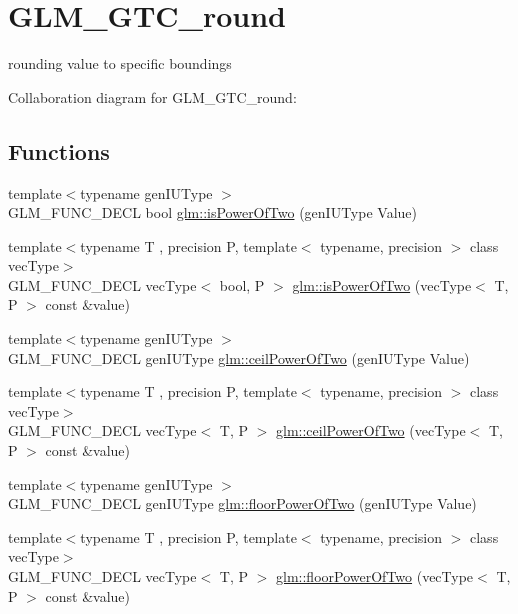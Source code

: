\hypertarget{group__gtc__round}{\section{G\-L\-M\-\_\-\-G\-T\-C\-\_\-round}
\label{group__gtc__round}
}


rounding value to specific boundings  


Collaboration diagram for G\-L\-M\-\_\-\-G\-T\-C\-\_\-round\-:
\subsection*{Functions}
\begin{DoxyCompactItemize}
\item 
{\footnotesize template$<$typename gen\-I\-U\-Type $>$ }\\G\-L\-M\-\_\-\-F\-U\-N\-C\-\_\-\-D\-E\-C\-L bool \hyperlink{group__gtc__round_gaebf826fbb6e0a70eeaab0792d89b25ec}{glm\-::is\-Power\-Of\-Two} (gen\-I\-U\-Type Value)
\item 
{\footnotesize template$<$typename T , precision P, template$<$ typename, precision $>$ class vec\-Type$>$ }\\G\-L\-M\-\_\-\-F\-U\-N\-C\-\_\-\-D\-E\-C\-L vec\-Type$<$ bool, P $>$ \hyperlink{group__gtc__round_gad454e4c8d8cd73ddc7de855f733a1465}{glm\-::is\-Power\-Of\-Two} (vec\-Type$<$ T, P $>$ const \&value)
\item 
{\footnotesize template$<$typename gen\-I\-U\-Type $>$ }\\G\-L\-M\-\_\-\-F\-U\-N\-C\-\_\-\-D\-E\-C\-L gen\-I\-U\-Type \hyperlink{group__gtc__round_gaa73c7690c787086fa3ac1c312264acab}{glm\-::ceil\-Power\-Of\-Two} (gen\-I\-U\-Type Value)
\item 
{\footnotesize template$<$typename T , precision P, template$<$ typename, precision $>$ class vec\-Type$>$ }\\G\-L\-M\-\_\-\-F\-U\-N\-C\-\_\-\-D\-E\-C\-L vec\-Type$<$ T, P $>$ \hyperlink{group__gtc__round_ga76ec9b214ea1376fe09a903e34bab847}{glm\-::ceil\-Power\-Of\-Two} (vec\-Type$<$ T, P $>$ const \&value)
\item 
{\footnotesize template$<$typename gen\-I\-U\-Type $>$ }\\G\-L\-M\-\_\-\-F\-U\-N\-C\-\_\-\-D\-E\-C\-L gen\-I\-U\-Type \hyperlink{group__gtc__round_gac80f6519c31baae10d8d7bea6735d1fa}{glm\-::floor\-Power\-Of\-Two} (gen\-I\-U\-Type Value)
\item 
{\footnotesize template$<$typename T , precision P, template$<$ typename, precision $>$ class vec\-Type$>$ }\\G\-L\-M\-\_\-\-F\-U\-N\-C\-\_\-\-D\-E\-C\-L vec\-Type$<$ T, P $>$ \hyperlink{group__gtc__round_ga6a5a8f6dd1b2f755e4572bd039062c37}{glm\-::floor\-Power\-Of\-Two} (vec\-Type$<$ T, P $>$ const \&value)

\end{DoxyCompactItemize}
